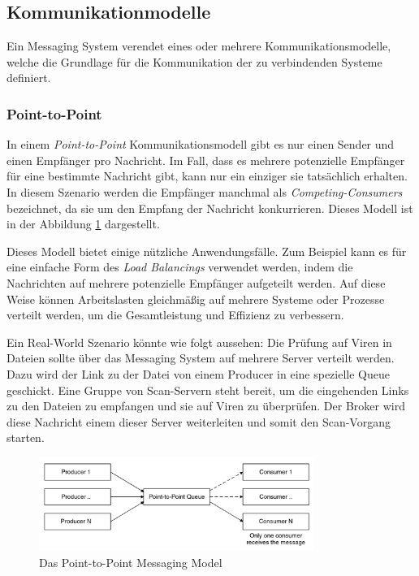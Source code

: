 \subsection{Kommunikationmodelle}

Ein Messaging System verendet eines oder mehrere Kommunikationsmodelle, welche die Grundlage für die Kommunikation der zu verbindenden Systeme definiert. \cite{curryMessageOrientedMiddleware2004}

\subsubsection{Point-to-Point}

In einem \emph{Point-to-Point} Kommunikationsmodell gibt es nur einen Sender und einen Empfänger pro Nachricht. Im Fall, dass es mehrere potenzielle Empfänger für eine bestimmte Nachricht gibt, kann nur ein einziger sie tatsächlich erhalten. In diesem Szenario werden die Empfänger manchmal als \emph{Competing-Consumers} bezeichnet, da sie um den Empfang der Nachricht konkurrieren. Dieses Modell ist in der Abbildung \ref{fig:point-to-pointMOM} dargestellt. \cite{curryMessageOrientedMiddleware2004}

Dieses Modell bietet einige nützliche Anwendungsfälle. Zum Beispiel kann es für eine einfache Form des \emph{Load Balancings} verwendet werden, indem die Nachrichten auf mehrere potenzielle Empfänger aufgeteilt werden. Auf diese Weise können Arbeitslasten gleichmäßig auf mehrere Systeme oder Prozesse verteilt werden, um die Gesamtleistung und Effizienz zu verbessern. \cite{curryMessageOrientedMiddleware2004}

Ein Real-World Szenario könnte wie folgt aussehen: Die Prüfung auf Viren in Dateien sollte über das Messaging System auf mehrere Server verteilt werden. Dazu wird der Link zu der Datei von einem Producer in eine spezielle Queue geschickt. Eine Gruppe von Scan-Servern steht bereit, um die eingehenden Links zu den Dateien zu empfangen und sie auf Viren zu überprüfen. Der Broker wird diese Nachricht einem dieser Server weiterleiten und somit den Scan-Vorgang starten.

\begin{figure}
    \centering
    \includegraphics[width=0.8\textwidth]{content/img/Research/Message_Services/point-to-pointMOM.png}
    \caption{Das Point-to-Point Messaging Model \cite{curryMessageOrientedMiddleware2004}}
    \label{fig:point-to-pointMOM}
\end{figure}
\FloatBarrier

